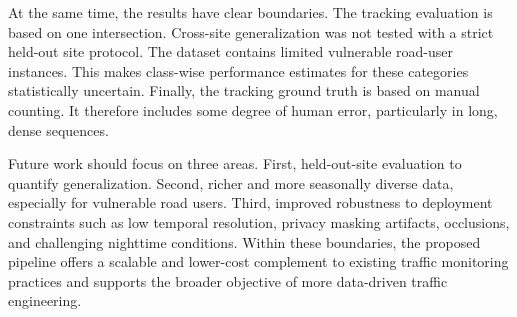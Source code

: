 At the same time, the results have clear boundaries. The tracking evaluation is based on one intersection. Cross-site generalization was not tested with a strict held-out site protocol. The dataset contains limited vulnerable road-user instances. This makes class-wise performance estimates for these categories statistically uncertain. Finally, the tracking ground truth is based on manual counting. It therefore includes some degree of human error, particularly in long, dense sequences.

Future work should focus on three areas. First, held-out-site evaluation to quantify generalization. Second, richer and more seasonally diverse data, especially for vulnerable road users. Third, improved robustness to deployment constraints such as low temporal resolution, privacy masking artifacts, occlusions, and challenging nighttime conditions. Within these boundaries, the proposed pipeline offers a scalable and lower-cost complement to existing traffic monitoring practices and supports the broader objective of more data-driven traffic engineering.
